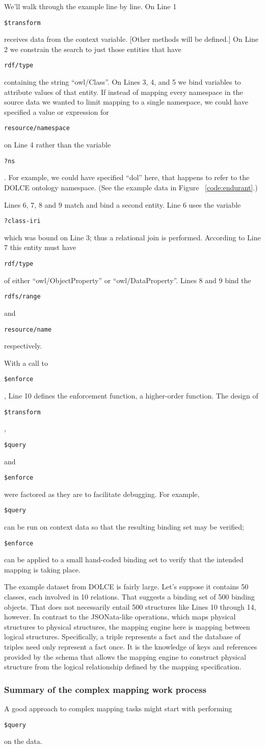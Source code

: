 \documentclass[9pt,letterpaper]{article}
\newcommand{\stt}[1]{\begin{footnotesize}\texttt{#1}\end{footnotesize}}
\begin{document}
We'll walk through the example line by line.
On Line 1 \stt{\$transform} receives data from the context variable. [Other methods will be defined.] %
On Line 2 we constrain the search to just those entities that have \stt{rdf/type} containing the string ``owl/Class''.
On Lines 3, 4, and 5 we bind variables to attribute values of that entity.
If instead of mapping every namespace in the source data we wanted to limit mapping to a single namespace,
we could have specified a value or expression for \stt{resource/namespace} on Line 4 rather than the variable \stt{?ns}.
For example, we could have specified ``dol'' here, that happens to refer to the DOLCE ontology namespace.
(See the example data in Figure ~\ref{code:endurant}.)

Lines 6, 7, 8 and 9 match and bind a second entity.
Line 6 uses the variable \stt{?class-iri} which was bound on Line 3; thus a relational join is performed.
According to Line 7 this entity must have \stt{rdf/type} of either ``owl/ObjectProperty'' or ``owl/DataProperty''.
Lines 8 and 9 bind the \stt{rdfs/range} and \stt{resource/name} respectively.

With a call to \stt{\$enforce}, Line 10 defines the enforcement function, a higher-order function.
The design of \stt{\$transform}, \stt{\$query} and \stt{\$enforce} were factored as they are to facilitate debugging.
For example, \stt{\$query} can be run on context data so that the resulting binding set may be verified;
\stt{\$enforce} can be applied to a small hand-coded binding set to verify that the intended mapping is taking place.

The example dataset from DOLCE is fairly large.
Let's suppose it contains 50 classes, each involved in 10 relations.
That suggests a binding set of 500 binding objects.
That does not necessarily entail 500 structures like Lines 10 through 14, however.
In contrast to the JSONata-like operations, which maps physical structures to physical structures,
the mapping engine here is mapping between logical structures.
Specifically, a triple represents a fact and the database of triples need only represent a fact once.
It is the knowledge of keys and references provided by the schema that allows the mapping engine to construct physical structure
from the logical relationship defined by the mapping specification.

\subsubsection{Summary of the complex mapping work process}
A good approach to complex mapping tasks might start with performing \stt{\$query} on the data.
\end{document}
